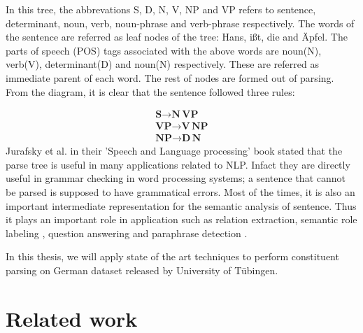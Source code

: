\documentclass[a4paper, 11pt]{article}
\begin{document}
In this tree, the abbrevations S, D, N, V, NP and VP refers to sentence, determinant, noun, verb, noun-phrase and verb-phrase respectively. The words of the sentence are referred as leaf nodes of the tree: Hans, ißt, die and Äpfel. The parts of speech (POS) tags associated with the above words are noun(N), verb(V), determinant(D) and noun(N) respectively. These are referred as immediate parent of each word. The rest of nodes are formed out of parsing. From the diagram, it is clear that the sentence followed three rules:

\begin{align*}
\textbf{S} \rightarrow \textbf{N} \, \textbf{VP} \\
\textbf{VP} \rightarrow \textbf{V} \, \textbf{NP} \\
\textbf{NP} \rightarrow \textbf{D} \, \textbf{N} 
\end{align*}
Jurafsky et al. \parencite{Jurafsky2008} in their 'Speech and Language processing' book stated that the parse tree is useful in many applications related to NLP. Infact they are directly useful in grammar checking in word processing systems; a sentence that cannot be parsed is supposed to have grammatical errors. Most of the times, it is also an important intermediate representation for the semantic analysis of sentence. Thus it plays an important role in application such as relation extraction, semantic role labeling \parencite{Gildea:2002:NPP:1073083.1073124}, question answering and paraphrase detection \parencite{Callison-Burch2010}.


In this thesis, we will apply state of the art techniques to perform constituent parsing on German dataset released by University of Tübingen.

\pagebreak
\section{Related work}

\end{document}
